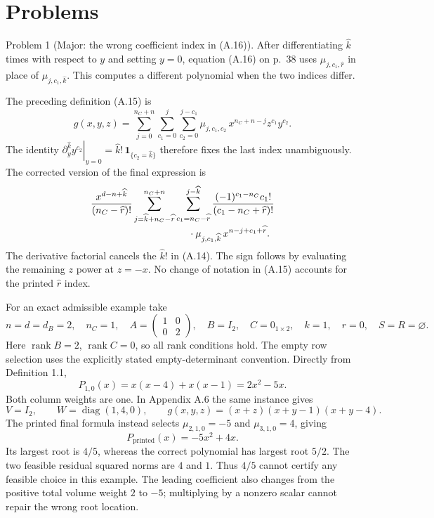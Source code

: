 \documentclass[10pt]{article}
\begin{document}
\section*{Problems}
Problem 1 (Major: the wrong coefficient index in (A.16)).  After differentiating \(\widehat k\) times with respect to \(y\) and setting \(y=0\), equation (A.16) on p. 38 uses \(\mu_{j,c_1,\widehat r}\) in place of \(\mu_{j,c_1,\widehat k}\). This computes a different polynomial when the two indices differ.\par
The preceding definition (A.15) is \[g(x,y,z)=\sum_{j=0}^{n_C+n}
 \sum_{c_1=0}^{j}\sum_{c_2=0}^{j-c_1}
 \mu_{j,c_1,c_2}\,x^{n_C+n-j}z^{c_1}y^{c_2}.\] The identity \(\left.\partial_y^{\widehat k}y^{c_2}\right|_{y=0}
=\widehat k!\,\mathbf 1_{\{c_2=\widehat k\}}\) therefore fixes the last index unambiguously. The corrected version of the final expression is \[\begin{aligned}
 &\frac{x^{d-n+\widehat k}}{(n_C-\widehat r)!}
 \sum_{j=\widehat k+n_C-\widehat r}^{n_C+n}
 \sum_{c_1=n_C-\widehat r}^{j-\widehat k}
 \frac{(-1)^{c_1-n_C}c_1!}{(c_1-n_C+\widehat r)!}\\[-2pt]
 &\hspace{35mm}\cdot
 \mu_{j,c_1,\widehat k}\,
 x^{n-j+c_1+\widehat r}.\end{aligned}\] The derivative factorial cancels the \(\widehat k!\) in (A.14). The sign follows by evaluating the remaining \(z\) power at \(z=-x\). No change of notation in (A.15) accounts for the printed \(\widehat r\) index.\par
For an exact admissible example take \[n=d=d_B=2,\quad n_C=1,\quad
 A=\begin{pmatrix}1&0\\0&2\end{pmatrix},\quad B=I_2,\quad C=0_{1\times2},
 \quad k=1,\quad r=0,\quad S=R=\varnothing.\] Here \(\operatorname{rank}B=2\), \(\operatorname{rank}C=0\), so all rank conditions hold. The empty row selection uses the explicitly stated empty-determinant convention. Directly from Definition 1.1, \[P_{1,0}(x)=x(x-4)+x(x-1)=2x^2-5x.\] Both column weights are one. In Appendix A.6 the same instance gives \[V=I_2,\qquad W=\operatorname{diag}(1,4,0),\qquad
 g(x,y,z)=(x+z)(x+y-1)(x+y-4).\] The printed final formula instead selects \(\mu_{2,1,0}=-5\) and \(\mu_{3,1,0}=4\), giving \[P_{\mathrm{printed}}(x)=-5x^2+4x.\] Its largest root is \(4/5\), whereas the correct polynomial has largest root \(5/2\). The two feasible residual squared norms are \(4\) and \(1\). Thus \(4/5\) cannot certify any feasible choice in this example. The leading coefficient also changes from the positive total volume weight \(2\) to \(-5\); multiplying by a nonzero scalar cannot repair the wrong root location.\par
\end{document}
